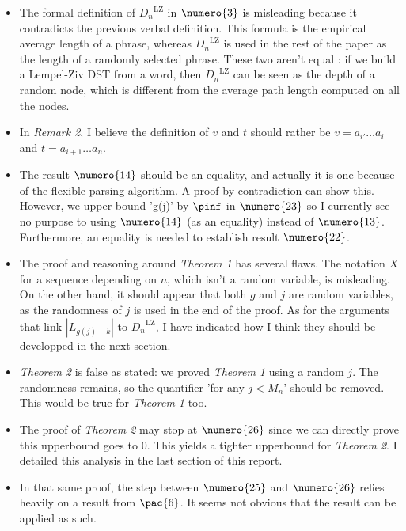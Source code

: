 
\begin{itemize}

\item The formal definition of ${D_n}^{\text{LZ}}$ in $\numero{3}$ is 
      misleading because it contradicts the previous verbal definition.
      This formula is the empirical average length of a phrase, whereas
      ${D_n}^{\text{LZ}}$ is used in the rest of the paper as the length
      of a randomly selected phrase. These two aren't equal :
      if we build a Lempel-Ziv DST from a word, then 
      ${D_n}^{\text{LZ}}$ can be seen as the depth of a random node, 
      which is different from the average path length computed 
      on all the nodes. 

\item In \emph{Remark 2}, I believe the definition of $v$ and 
      $t$ should rather be 
      $ v = a_{i'} \dots a_{i} $ and
      $ t = a_{i+1} \dots a_n$. 

\item The result $\numero{14}$ should be an equality, and actually it is one
      because of the flexible parsing algorithm. A proof by contradiction
      can show this. However, we upper bound 'g(j)' by $\pinf$ in 
      $\numero{23}$ so I currently see no purpose to using $\numero{14}$ (as an 
      equality) instead of $\numero{13}$. Furthermore, an equality is 
      needed to establish result $\numero{22}$.

\item The proof and reasoning around \emph{Theorem 1} has several flaws.
      The notation $X$ for a sequence depending on $n$, which isn't a 
      random variable, is misleading. On the other hand, it should appear
      that both $g$ and $j$ are random variables, as the randomness of 
      $j$ is used in the end of the proof. As for the arguments that 
      link $|L_{g(j)-k}|$ to ${D_n}^{\text{LZ}}$, I have
      indicated how I think they should be developped in the next section.

\item \emph{Theorem 2} is false as stated: we proved \emph{Theorem 1}
      using a random $j$. The randomness remains, so the quantifier
      'for any $j < M_n$' should be removed. This would be true for 
      \emph{Theorem 1} too.

\item The proof of \emph{Theorem 2} may stop at $\numero{26}$
      since we can directly prove this upperbound goes to $0$.
      This yields a tighter upperbound for \emph{Theorem 2}.
      I detailed this analysis in the last section of this report.

\item In that same proof, the step between $\numero{25}$ and 
      $\numero{26}$ relies heavily on a result from $\pac{6}$.
      It seems not obvious that the result can be applied as such.

\end{itemize}